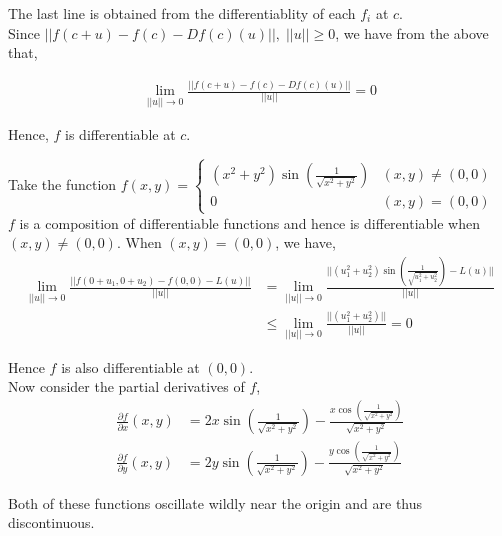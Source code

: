 \documentclass[12pt]{article}
\newenvironment{problem}[2][Problem]{\begin{trivlist}
\item[\hskip \labelsep {\bfseries #1}\hskip \labelsep {\bfseries #2.}]}{\end{trivlist}}
\begin{document}
The last line is obtained from the differentiablity of each $f_i$ at $c$.\\

Since $||f(c+u) - f(c) - Df(c)(u)||, \; ||u|| \geq 0$, we have from the above that,

\begin{align*}
\lim_{||u|| \to 0} \frac{||f(c+u) - f(c) - Df(c)(u)||}{||u||} = 0
\end{align*}

Hence, $f$ is differentiable at $c$.

\begin{problem}{2}
\end{problem}

Take the function $f(x, y) = \begin{cases} 
      (x^2 + y^2) \sin \left(\frac{1}{\sqrt{x^2 + y^2}} \right) & (x, y) \neq (0, 0) \\
      0 & (x, y) = (0, 0)
   \end{cases}$\\

$f$ is a composition of differentiable functions and hence is differentiable when $(x, y) \neq (0, 0)$. When $(x, y) = (0, 0)$, we have,
\begin{align*}
\lim_{||u|| \to 0} \frac{||f(0 + u_1, 0 + u_2) - f(0, 0) - L(u)||}{||u||} &= \lim_{||u|| \to 0} \frac{||(u_1^2 + u_2^2) \sin \left(\frac{1}{\sqrt{u_1^2 + u_2^2}} \right) - L(u)||}{||u||}\\
&\leq \lim_{||u|| \to 0} \frac{||(u_1^2 + u_2^2)||}{||u||} = 0
\end{align*}

Hence $f$ is also differentiable at $(0, 0)$.\\

Now consider the partial derivatives of $f$,
\begin{align*}
\frac{\partial f}{\partial x} (x, y) &= 2x \sin \left(\frac{1}{\sqrt{x^2 + y^2}} \right) - \frac{x \cos \left(\frac{1}{\sqrt{x^2 + y^2}} \right)}{\sqrt{x^2 + y^2}}\\
\frac{\partial f}{\partial y} (x, y) &= 2y \sin \left(\frac{1}{\sqrt{x^2 + y^2}} \right) - \frac{y \cos \left(\frac{1}{\sqrt{x^2 + y^2}} \right)}{\sqrt{x^2 + y^2}}
\end{align*}

Both of these functions oscillate wildly near the origin and are thus discontinuous.
\newpage
\begin{problem}{3}
\end{problem}
\end{document}
